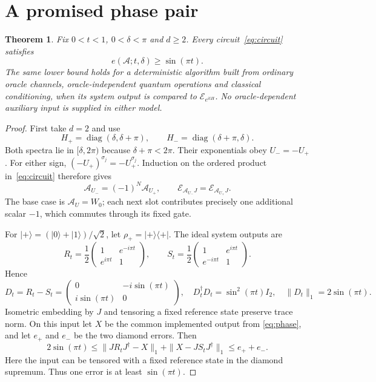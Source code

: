 \documentclass[11pt]{article}
\newtheorem{theorem}{Theorem}
\newcommand{\E}{\mathcal E}
\newcommand{\A}{\mathcal A}
\newcommand{\ket}[1]{\lvert #1\rangle}
\newcommand{\bra}[1]{\langle #1\rvert}
\begin{document}
\section{A promised phase pair}
\begin{theorem}\label{thm:floor}
Fix $0<t<1$, $0<\delta<\pi$ and $d\geq2$.
Every circuit~\eqref{eq:circuit} satisfies
\[
 e(\A;t,\delta)\geq\sin(\pi t).
\]
The same lower bound holds for a deterministic algorithm built from ordinary
oracle channels, oracle-independent quantum operations and classical
conditioning, when its system output is compared to $\E_{e^{itH}}$.
No oracle-dependent auxiliary input is supplied in either model.
\end{theorem}
\begin{proof}
First take $d=2$ and use
\[
 H_+=\operatorname{diag}(\delta,\delta+\pi),\qquad
 H_-=\operatorname{diag}(\delta+\pi,\delta).
\]
Both spectra lie in $[\delta,2\pi)$ because $\delta+\pi<2\pi$.
Their exponentials obey $U_-=-U_+$.
For either sign, $(-U_+)^{\sigma_j}=-U_+^{\sigma_j}$.
Induction on the ordered product in~\eqref{eq:circuit} therefore gives
\begin{equation}\label{eq:phase}
 \A_{U_-}=(-1)^N\A_{U_+},\qquad
 \E_{\A_{U_-}J}=\E_{\A_{U_+}J}.
\end{equation}
The base case is $\A_U=W_0$; each next slot contributes precisely one
additional scalar $-1$, which commutes through its fixed gate.

For $\ket+=(\ket0+\ket1)/\sqrt2$, let $\rho_+=\ket+\bra+$.
The ideal system outputs are
\[
 R_t=\frac12\begin{pmatrix}1&e^{-i\pi t}\\e^{i\pi t}&1\end{pmatrix},
 \qquad
 S_t=\frac12\begin{pmatrix}1&e^{i\pi t}\\e^{-i\pi t}&1\end{pmatrix}.
\]
Hence
\[
 D_t=R_t-S_t
 =\begin{pmatrix}0&-i\sin(\pi t)\\i\sin(\pi t)&0\end{pmatrix},
 \quad D_t^\dagger D_t=\sin^2(\pi t)I_2,
 \quad \|D_t\|_1=2\sin(\pi t).
\]
Isometric embedding by $J$ and tensoring a fixed reference state preserve
trace norm. On this input let $X$ be the common implemented output from
\eqref{eq:phase}, and let $e_+$ and $e_-$ be the two diamond errors. Then
\[
 2\sin(\pi t)\leq
 \|JR_tJ^\dagger-X\|_1+\|X-JS_tJ^\dagger\|_1
 \leq e_++e_-.
\]
Here the input can be tensored with a fixed reference state in the diamond
supremum. Thus one error is at least $\sin(\pi t)$.


\end{proof}
\end{document}
